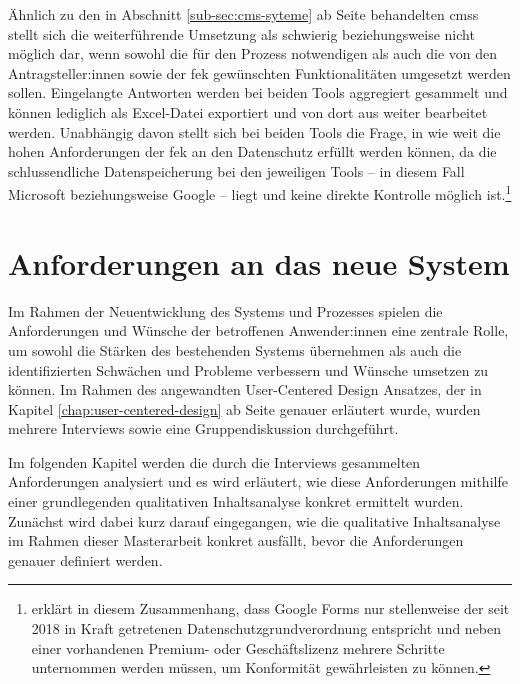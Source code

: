 \documentclass[a4paper,12pt,twoside,numbers=noendperiod]{scrreprt}
\begin{document}
Ähnlich zu den in Abschnitt \ref{sub-sec:cms-syteme} ab Seite \pageref{sub-sec:cms-syteme} behandelten \aclp{cms} stellt sich die weiterführende Umsetzung als schwierig beziehungsweise nicht möglich dar, wenn sowohl die für den Prozess notwendigen als auch die von den Antragsteller:innen sowie der \ac{fek} gewünschten Funktionalitäten umgesetzt werden sollen. Eingelangte Antworten werden bei beiden Tools aggregiert gesammelt und können lediglich als Excel-Datei exportiert und von dort aus weiter bearbeitet werden. \cite{microsoft_corporation_wie_2021, google_ireland_limited_ergebnisse_2023} Unabhängig davon stellt sich bei beiden Tools die Frage, in wie weit die hohen Anforderungen der \acl{fek} an den Datenschutz erfüllt werden können, da die schlussendliche Datenspeicherung bei den jeweiligen Tools -- in diesem Fall Microsoft beziehungsweise Google -- liegt und keine direkte Kontrolle möglich ist.\footnote{\cite{visitor_analytics_gmbh_ist_2022} erklärt in diesem Zusammenhang, dass Google Forms nur stellenweise der seit 2018 in Kraft getretenen Datenschutzgrundverordnung entspricht und neben einer vorhandenen Premium- oder Geschäftslizenz mehrere Schritte unternommen werden müssen, um Konformität gewährleisten zu können.}

\cleardoublepage
\chapter{Anforderungen an das neue System}
\label{chap:anforderung-neues-system}

Im Rahmen der Neuentwicklung des Systems und Prozesses spielen die Anforderungen und Wünsche der betroffenen Anwender:innen eine zentrale Rolle, um sowohl die Stärken des bestehenden Systems übernehmen als auch die identifizierten Schwächen und Probleme verbessern und Wünsche umsetzen zu können. Im Rahmen des angewandten User-Centered Design Ansatzes, der in Kapitel \ref{chap:user-centered-design} ab Seite \pageref{chap:user-centered-design} genauer erläutert wurde, wurden mehrere Interviews sowie eine Gruppendiskussion durchgeführt.

Im folgenden Kapitel werden die durch die Interviews gesammelten Anforderungen analysiert und es wird erläutert, wie diese Anforderungen mithilfe einer grundlegenden qualitativen Inhaltsanalyse konkret ermittelt wurden. Zunächst wird dabei kurz darauf eingegangen, wie die qualitative Inhaltsanalyse im Rahmen dieser Masterarbeit konkret ausfällt, bevor die Anforderungen genauer definiert werden.
\end{document}
